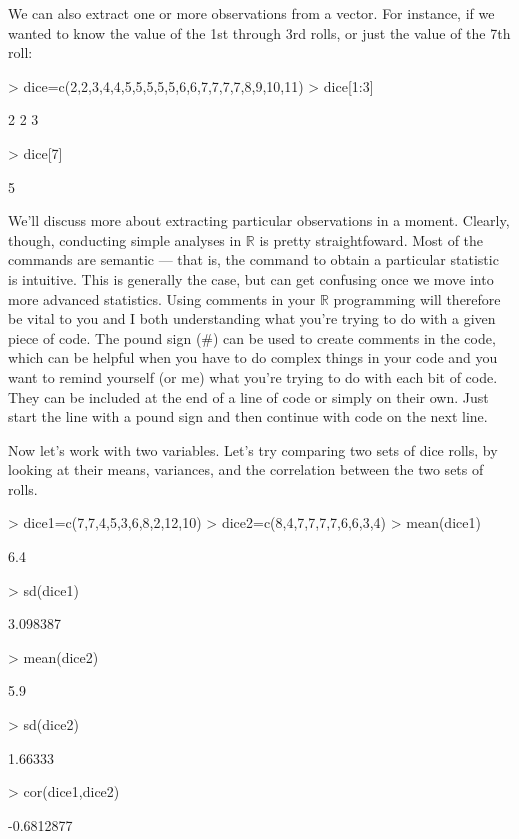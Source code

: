 \documentclass[12pt]{article}
\begin{document}
We can also extract one or more observations from a vector. For instance, if we wanted to know the value of the 1st through 3rd rolls, or just the value of the 7th roll:
\begin{Schunk}
\begin{Sinput}
> dice=c(2,2,3,4,4,5,5,5,5,5,6,6,7,7,7,7,8,9,10,11)
> dice[1:3]
\end{Sinput}
\begin{Soutput}
[1] 2 2 3
\end{Soutput}
\begin{Sinput}
> dice[7]
\end{Sinput}
\begin{Soutput}
[1] 5
\end{Soutput}
\end{Schunk}
We'll discuss more about extracting particular observations in a moment. Clearly, though, conducting simple analyses in $\mathbb{R}$ is pretty straightfoward. Most of the commands are semantic --- that is, the command to obtain a particular statistic is intuitive. This is generally the case, but can get confusing once we move into more advanced statistics. Using comments in your $\mathbb{R}$ programming will therefore be vital to you and I both understanding what you're trying to do with a given piece of code. The pound sign (\#) can be used to create comments in the code, which can be helpful when you have to do complex things in your code and you want to remind yourself (or me) what you're trying to do with each bit of code. They can be included at the end of a line of code or simply on their own. Just start the line with a pound sign and then continue with code on the next line.

Now let's work with two variables. Let's try comparing two sets of dice rolls, by looking at their means, variances, and the correlation between the two sets of rolls.
\begin{Schunk}
\begin{Sinput}
> dice1=c(7,7,4,5,3,6,8,2,12,10)
> dice2=c(8,4,7,7,7,7,6,6,3,4)
> mean(dice1)
\end{Sinput}
\begin{Soutput}
[1] 6.4
\end{Soutput}
\begin{Sinput}
> sd(dice1)
\end{Sinput}
\begin{Soutput}
[1] 3.098387
\end{Soutput}
\begin{Sinput}
> mean(dice2)
\end{Sinput}
\begin{Soutput}
[1] 5.9
\end{Soutput}
\begin{Sinput}
> sd(dice2)
\end{Sinput}
\begin{Soutput}
[1] 1.66333
\end{Soutput}
\begin{Sinput}
> cor(dice1,dice2)
\end{Sinput}
\begin{Soutput}
[1] -0.6812877
\end{Soutput}
\end{Schunk}
\end{document}
